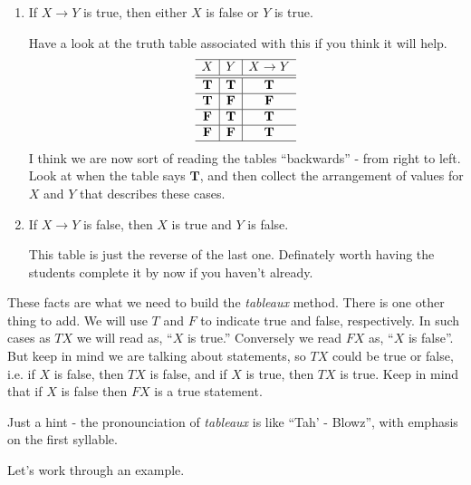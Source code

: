 \begin{enumerate}
\item If $X\rightarrow Y$ is true, then either $X$ is false or $Y$ is true. \label{fs7} \ifKey\hfill\begin{minipage}{0.3\textwidth}\color{red} Have a look at the truth table associated with this if you think it will help.
\[  \begin{array}{c|c|c}
  \hline  
X	&Y	& X\rightarrow Y	\\
  \hline
  \hline
 \mathbf{T} &  \mathbf{T} &  \mathbf{T} \\
  \hline
 \mathbf{T} &  \mathbf{F} &  \mathbf{F}\\
  \hline
 \mathbf{F} &  \mathbf{T} &  \mathbf{T}\\
  \hline
 \mathbf{F} &  \mathbf{F} &  \mathbf{T}\\
    \hline
    \end{array}\]
 I think we are now sort of reading the tables ``backwards'' - from right to left.  Look at when the table says $\mathbf{T}$, and then collect the arrangement of values for $X$ and $Y$ that describes these cases.     \end{minipage} \fi

\item If $X\rightarrow Y$ is false, then  $X$ is true and  $Y$ is false. \label{fs8}\ifKey\hfill\begin{minipage}{0.3\textwidth}\color{red}  This table is just the reverse of the last one.  Definately worth having the students complete it by now if you haven't already.\end{minipage}\fi

\end{enumerate}
These  facts are what we need to build the \emph{tableaux} method.  There is one other thing to add.  We will use $T$ and $F$ to indicate true and false, respectively.  In such cases as $TX$ we will read as, ``$X$ is true.''  Conversely we read $FX$ as, ``$X$ is false''.  But keep in mind we are talking about statements, so $TX$ could be true or false, i.e. if $X$ is false, then $TX$ is false, and if $X$ is true, then $TX$ is true. Keep in mind that if $X$ is false then $FX$ is a true statement.  

 \ifKey\hfill\begin{minipage}{0.3\textwidth}\color{red}  Just a hint - the pronounciation of  \emph{tableaux} is like ``Tah' - Blowz'', with emphasis on the first syllable. \end{minipage}\fi

Let's work through an example.

